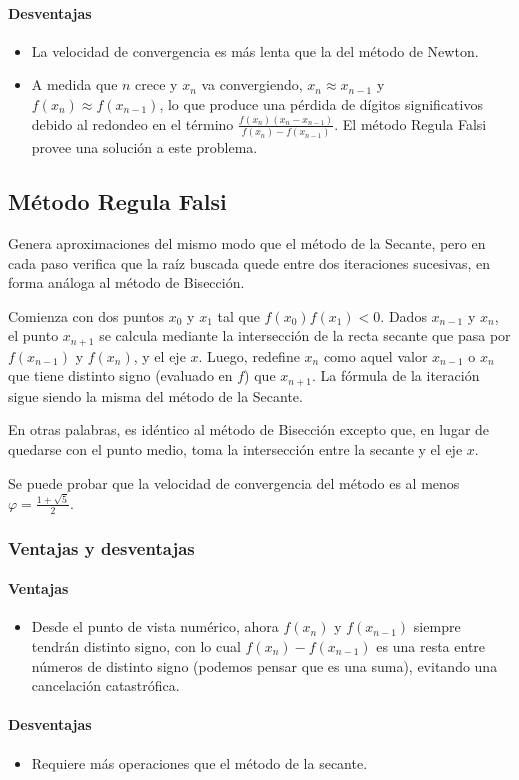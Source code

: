 \paragraph{Desventajas}
\begin{itemize}
\item La velocidad de convergencia es más lenta que la del método de Newton.

\item A medida que $n$ crece y $x_n$ va convergiendo, $x_n \approx x_{n - 1}$ y $f(x_n) \approx f(x_{n - 1})$, lo que produce una pérdida de dígitos significativos debido al redondeo en el término $\frac{f(x_n)(x_n - x_{n - 1})}{f(x_n) - f(x_{n - 1})}$. El método Regula Falsi provee una solución a este problema.
\end{itemize}

\subsection{Método Regula Falsi}

Genera aproximaciones del mismo modo que el método de la Secante, pero en cada paso verifica que la raíz buscada quede entre dos iteraciones sucesivas, en forma análoga al método de Bisección.

Comienza con dos puntos $x_0$ y $x_1$ tal que $f(x_0)f(x_1) < 0$. Dados $x_{n - 1}$ y $x_n$, el punto $x_{n + 1}$ se calcula mediante la intersección de la recta secante que pasa por $f(x_{n - 1})$ y $f(x_n)$, y el eje $x$. Luego, redefine $x_n$ como aquel valor $x_{n - 1}$ o $x_n$ que tiene distinto signo (evaluado en $f$) que $x_{n + 1}$. La fórmula de la iteración sigue siendo la misma del método de la Secante.

En otras palabras, es idéntico al método de Bisección excepto que, en lugar de quedarse con el punto medio, toma la intersección entre la secante y el eje $x$.

Se puede probar que la velocidad de convergencia del método es al menos $\varphi = \frac{1 + \sqrt{5}}{2}$.

\subsubsection{Ventajas y desventajas}

\paragraph{Ventajas}
\begin{itemize}
\item Desde el punto de vista numérico, ahora $f(x_n)$ y $f(x_{n - 1})$ siempre tendrán distinto signo, con lo cual $f(x_n) - f(x_{n - 1})$ es una resta entre números de distinto signo (podemos pensar que es una suma), evitando una cancelación catastrófica.
\end{itemize}

\paragraph{Desventajas}
\begin{itemize}
\item Requiere más operaciones que el método de la secante.
\end{itemize}